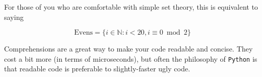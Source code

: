\documentclass{article}
\begin{document}
For those of you who are comfortable with simple set theory, this is
equivalent to saying

\[ \textrm{Evens} = \{ i \in \mathbb{N} : i < 20, i\equiv 0 \bmod{2} \}\]

Comprehensions are a great way to make your code readable and concise.
They cost a bit more (in terms of microseconds), but often the
philosophy of \texttt{Python} is that readable code is preferable to
slightly-faster ugly code.


    
    
    
    
\end{document}

